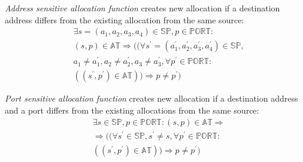 \documentclass[twoside]{article}
\begin{document}
\begin{multicols}{2}
\emph{Address sensitive allocation function} creates new allocation if a destination address differs from the existing allocation 
from the same source:
\begin{align*}
& \exists s=(a_1,a_2,a_3,a_4) \in \mathbb{SP}, p \in \mathbb{PORT}: \\
& (s, p) \in \mathbb{AT} \Rightarrow ((\forall s^{\prime}=(a_1^{\prime},a_2^{\prime},a_3^{\prime},a_4^{\prime}) \in \mathbb{SP}, \\
& a_1 \neq a_1^{\prime}, a_2 \neq a_2^{\prime}, a_3 \neq a_3^{\prime}, \forall p^{\prime} \in \mathbb{PORT}: \\
& ((s^{\prime}, p^{\prime}) \in \mathbb{AT})) \Rightarrow p \neq p^{\prime})
\end{align*}

\emph{Port sensitive allocation function} creates new allocation if a destination address and a port differs from the existing
allocations from the same source:
\begin{align*}
& \exists s \in \mathbb{SP}, p \in \mathbb{PORT}: (s, p) \in \mathbb{AT} \Rightarrow \\
& \Rightarrow ((\forall s^{\prime} \in \mathbb{SP}, s^{\prime} \neq s , \forall p^{\prime} \in \mathbb{PORT}: \\
& ((s^{\prime}, p^{\prime}) \in \mathbb{AT})) \Rightarrow p \neq p^{\prime})
\end{align*}
% 



\end{multicols}
\end{document}
